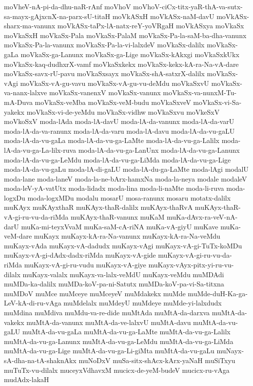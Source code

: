 {moVheV-nA-pi-da-dhu-naR-rAnf
moVhoV
moVhoV-ciCx-titx-yaR-thA-va-sutx-sa-mayx-gAjxcnX-na-parx-sU-titaH
moVkASxH
moVkASx-naM-davU
moVkASx-sharx-ma-vanunx
moVkASx-taPx-lA-natx-reY-yoVRgaH
moVkASxya
moVkaSx
moVkaSxH
moVkaSx-Pala
moVkaSx-PalaM
moVkaSx-Pa-la-saM-ba-dha-vanunx
moVkaSx-Pa-la-vanunx
moVkaSx-Pa-la-vi-lalxdeV
moVkaSx-dalilx
moVkaSx-gaLa
moVkaSx-ga-Lanunx
moVkaSx-ga-Lige
moVkaSx-kAkxgi
moVkaSxkUkx
moVkaSx-kaq-dudhxrX-vamf
moVkaSxkekx
moVkaSx-kekx-kA-ra-Na-vA-dare
moVkaSx-savx-rU-pavu
moVkaSxsayx
moVkaSx-shA-satxrX-dalilx
moVkaSx-vAgi
moVkaSx-vA-gu-vavu
moVkaSx-vA-gu-vu-deMdu
moVkaSxvU
moVkaSx-va-nanx-lalxve
moVkaSx-vanenxV
moVkaSx-vanunx
moVkaSx-va-nunxM-Tu-mA-Duva
moVkaSx-veMba
moVkaSx-veM-budu
moVkaSxveV
moVkaSx-vi-Sa-yakekx
moVkaSx-vi-de-yeMdu
moVkaSx-vidhw
moVkaSxvu
moVkeSxV
moVkoSxV
moda-lAda
moda-lA-davU
moda-lA-da-vanunx
moda-lA-da-varU
moda-lA-da-va-ranunx
moda-lA-da-varu
moda-lA-davu
moda-lA-da-vu-gaLU
moda-lA-da-vu-gaLa
moda-lA-da-vu-ga-LaMte
moda-lA-da-vu-ga-Lalilx
moda-lA-da-vu-ga-La-lilx-ruva
moda-lA-da-vu-ga-LanUnx
moda-lA-da-vu-ga-Lanunx
moda-lA-da-vu-ga-LeMdu
moda-lA-da-vu-ga-LiMda
moda-lA-da-vu-ga-Lige
moda-lA-da-vu-gaLu
moda-lA-di-gaLU
moda-lA-du-ga-LaMte
moda-lAgi
modalU
moda-lane
moda-laneV
moda-la-ne-bArx-hamxNa
moda-la-neya
modale
modaleV
moda-leV-yA-vatUtx
moda-lidadx
moda-lina
moda-li-naMte
moda-li-ruva
moda-logxDu
moda-logxMDu
modalu
mosarU
mosa-ranunx
mosaru
motatx-dalilx
muKAyx
muKAyxthaR
muKAyx-thaR-dalilx
muKAyx-thaRvA
muKAyx-thaR-vA-gi-ru-vu-da-riMda
muKAyx-thaR-vanunx
muKaM
muKa-dAvx-ra-veV-nA-darU
muKa-mi-teyxVvaM
muKa-saM-cA-riNA
muKa-vA-giyU
muKave
muKa-veM-dare
muKayx
muKayx-kA-ra-Na-vanunx
muKayx-kA-ra-Na-veMdu
muKayx-vAda
muKayx-vA-dadudx
muKayx-vAgi
muKayx-vA-gi-TuTx-koMDu
muKayx-vA-gi-dAdx-dadx-riMda
muKayx-vA-gide
muKayx-vA-gi-ru-vu-da-riMda
muKayx-vA-gi-ru-vudu
muKayx-vA-giye
muKayx-vAyx-pitx-yi-ru-vu-dilalx
muKayx-valalx
muKayx-va-lalx-veMdU
muKayx-veMdu
muMDAdi
muMDa-ka-dalilx
muMDa-koV-pa-ni-Satutx
muMDa-koV-pa-vi-Sa-titxna
muMDoV
muMce
muMceye
muMceyeV
muMdakekx
muMde
muMde-duH-Ka-ga-LeV-kA-di-ru-vAga
muMdelalx
muMdeyU
muMdeye
muMde-yi-lalxdudx
muMdina
muMdiva
muMdu-va-re-dide
muMtAda
muMtA-da-darxva
muMtA-da-vakekx
muMtA-da-vanunx
muMtA-da-ve-lalxvU
muMtA-davu
muMtA-da-vu-gaLU
muMtA-da-vu-gaLa
muMtA-da-vu-ga-LaMte
muMtA-da-vu-ga-Lalilx
muMtA-da-vu-ga-Lanunx
muMtA-da-vu-ga-LeMdu
muMtA-da-vu-ga-LiMda
muMtA-da-vu-ga-Lige
muMtA-da-vu-ga-Li-giMta
muMtA-da-vu-gaLu
muNayx-sA-dha-na-tA-shaknAkx
muNoDxV
muSa-sitx-shAcx-kArx-yaNaH
muSiTxyu
muTuTx-vu-dilalx
muceyxVdhavxM
mucicx-de-yeM-budeV
mucicx-ru-vAga
mudAdx-lakaH
}
